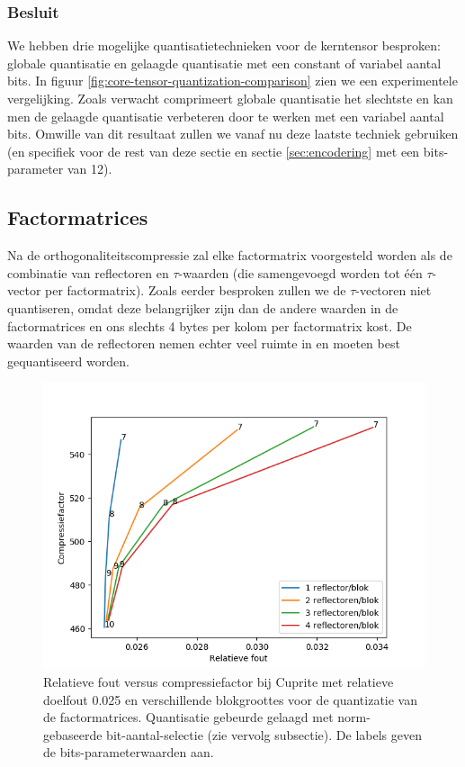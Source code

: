 \subsubsection{Besluit}

We hebben drie mogelijke quantisatietechnieken voor de kerntensor besproken: globale quantisatie en gelaagde quantisatie met een constant of variabel aantal bits. In figuur \ref{fig:core-tensor-quantization-comparison} zien we een experimentele vergelijking. Zoals verwacht comprimeert globale quantisatie het slechtste en kan men de gelaagde quantisatie verbeteren door te werken met een variabel aantal bits. Omwille van dit resultaat zullen we vanaf nu deze laatste techniek gebruiken (en specifiek voor de rest van deze sectie en sectie \ref{sec:encodering} met een bits-parameter van 12).

\subsection{Factormatrices}
\label{sec:quantisatie-factor-matrices}

Na de orthogonaliteitscompressie zal elke factormatrix voorgesteld worden als de combinatie van reflectoren en $\tau$-waarden (die samengevoegd worden tot \'e\'en $\tau$-vector per factormatrix). Zoals eerder besproken zullen we de $\tau$-vectoren niet quantiseren, omdat deze belangrijker zijn dan de andere waarden in de factormatrices en ons slechts 4 bytes per kolom per factormatrix kost. De waarden van de reflectoren nemen echter veel ruimte in en moeten best gequantiseerd worden.

\begin{figure}[H]
  \centering
  \includegraphics[scale=0.7]{images/factor_matrix_quantization_block_cols.png}
  \caption{Relatieve fout versus compressiefactor bij Cuprite met relatieve doelfout 0.025 en verschillende blokgroottes voor de quantizatie van de factormatrices. Quantisatie gebeurde gelaagd met norm-gebaseerde bit-aantal-selectie (zie vervolg subsectie). De labels geven de bits-parameterwaarden aan.}
\label{fig:factor-matrix-quantization-block-cols}
\end{figure}

